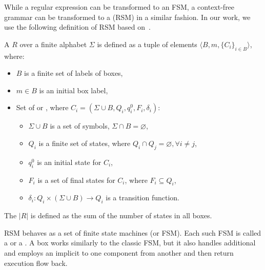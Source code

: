 While a regular expression can be transformed to an FSM, a context-free grammar can be transformed to a  (RSM) in a similar fashion.
In our work, we use the following definition of RSM based
on~\cite{rsm:analysis:10.1007/3-540-44585-4_18}.

\begin{definition}
A  $R$ over a finite alphabet $\Sigma$ is defined as a tuple of elements $\langle B,m,\{C_i\}_{i \in B} \rangle$, where:

\begin{itemize}
    \item $B$ is a finite set of labels of boxes,
    \item $m \in B$ is an initial box label,
    \item Set of  or ,
          where $C_i=(\Sigma \cup B, Q_i,q_i^0,F_i,\delta_i)$:
    \begin{itemize}
        \item $\Sigma \cup B$ is a set of symbols, $\Sigma \cap B = \varnothing$,
        \item $Q_i$ is a finite set of states,
              where $Q_i \cap Q_j =  \varnothing, \forall i \neq j$,
        \item $q_i^0$ is an initial state for $C_i$,
        \item $F_i$ is a set of final states for $C_i$, where $F_i \subseteq Q_i$,
        \item $\delta_i: Q_i \times (\Sigma \cup B) \to Q_i$ is a transition function. %
    \end{itemize}
\end{itemize}

\end{definition}

\begin{definition}
    The  $|R|$ is defined as the sum of the number of states in all boxes.
\end{definition}

RSM behaves as a set of finite state machines (or FSM).
Each such FSM is called a  or a .
A box works similarly to the classic FSM, but it also handles additional  and employs an implicit  to  one component from another and then return execution flow back.

